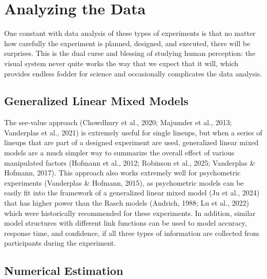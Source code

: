 \documentclass[
  10pt,
  letterpaper,
  DIV=11,
  numbers=noendperiod]{scrartcl}
\begin{document}
\section{Analyzing the Data}\label{sec-analysis}

One constant with data analysis of these types of experiments is that no
matter how carefully the experiment is planned, designed, and executed,
there will be surprises. This is the dual curse and blessing of studying
human perception: the visual system never quite works the way that we
expect that it will, which provides endless fodder for science and
occasionally complicates the data analysis.

\subsection{Generalized Linear Mixed
Models}\label{generalized-linear-mixed-models}

The see-value approach (Chowdhury et al., 2020; Majumder et al., 2013;
Vanderplas et al., 2021) is extremely useful for single lineups, but
when a series of lineups that are part of a designed experiment are
used, generalized linear mixed models are a much simpler way to
summarize the overall effect of various manipulated factors (Hofmann et
al., 2012; Robinson et al., 2025; Vanderplas \& Hofmann, 2017). This
approach also works extremely well for psychometric experiments
(Vanderplas \& Hofmann, 2015), as psychometric models can be easily fit
into the framework of a generalized linear mixed model (Ju et al., 2024)
that has higher power than the Rasch models (Andrich, 1988; Lu et al.,
2022) which were historically recommended for these experiments. In
addition, similar model structures with different link functions can be
used to model accuracy, response time, and confidence, if all three
types of information are collected from participants during the
experiment.

\subsection{Numerical Estimation}\label{numerical-estimation}
\end{document}
